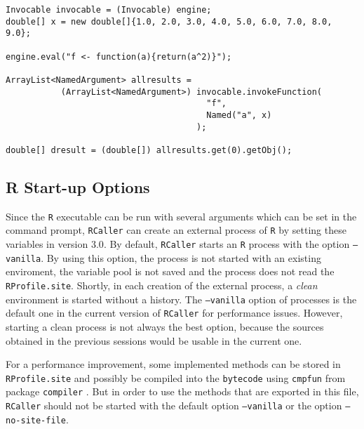\documentclass[10pt,a4paper, final, oneside]{article}
\begin{document}
\begin{minipage}{\linewidth}
\begin{lstlisting}[caption=Invoking user-defined functions,label=code_invoke_userfunction]
Invocable invocable = (Invocable) engine;
double[] x = new double[]{1.0, 2.0, 3.0, 4.0, 5.0, 6.0, 7.0, 8.0, 9.0};
        
engine.eval("f <- function(a){return(a^2)}");

ArrayList<NamedArgument> allresults = 
           (ArrayList<NamedArgument>) invocable.invokeFunction(
                                        "f", 
                                        Named("a", x)
                                      );
                                      
double[] dresult = (double[]) allresults.get(0).getObj();        
\end{lstlisting}
\end{minipage}
        
        
\subsection{R Start-up Options}
\label{sec:r_startup_options}
Since the \texttt{R} executable can be run with several arguments which can be set in the command prompt, \texttt{RCaller} can create an external process of \texttt{R} by setting these variables in version $3.0$. By default, \texttt{RCaller} starts an \texttt{R} process with the option \texttt{--vanilla}. By using this option, the process is not started with an existing enviroment, the variable pool is not saved and the process does not read the \texttt{RProfile.site}. Shortly, in each creation of the external process, a \textit{clean} environment is started without a history. The \texttt{--vanilla} option of processes is the default one in the current version of \texttt{RCaller} for performance issues. However, starting a clean process is not always the best option, because the sources obtained in the previous sessions would be usable in the current one.

For a performance improvement, some implemented methods can be stored in \texttt{RProfile.site} and possibly be compiled into the \texttt{bytecode} using \texttt{cmpfun} from package \texttt{compiler} \cite{lim2015r,tierney2001compiling}. But in order to use the methods that are exported in this file, \texttt{RCaller} should not be started with the default option \texttt{--vanilla} or the option \texttt{--no-site-file}. 
\end{document}
